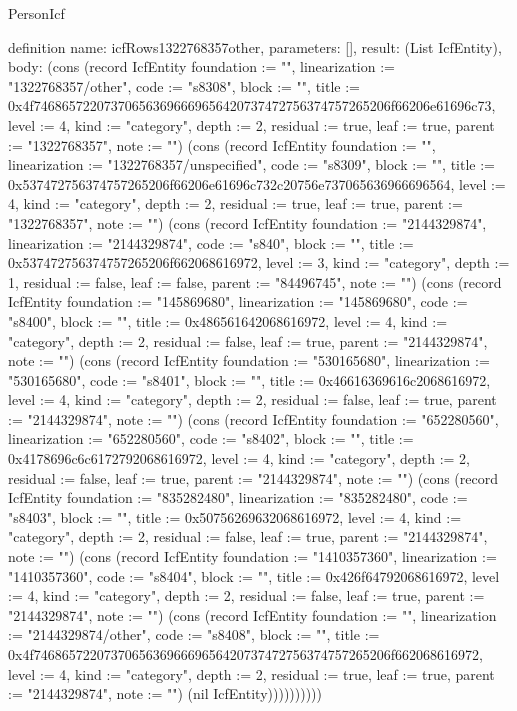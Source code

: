 \begin{lexlean}{PersonIcf}
\begin{semanticmodule}
definition{
  name: icfRows1322768357other,
  parameters: [],
  result: (List IcfEntity),
  body: (cons (record IcfEntity {foundation := "", linearization := "1322768357/other", code := "s8308", block := "", title := 0x4f746865722073706563696669656420737472756374757265206f66206e61696c73, level := 4, kind := "category", depth := 2, residual := true, leaf := true, parent := "1322768357", note := ""}) (cons (record IcfEntity {foundation := "", linearization := "1322768357/unspecified", code := "s8309", block := "", title := 0x537472756374757265206f66206e61696c732c20756e737065636966696564, level := 4, kind := "category", depth := 2, residual := true, leaf := true, parent := "1322768357", note := ""}) (cons (record IcfEntity {foundation := "2144329874", linearization := "2144329874", code := "s840", block := "", title := 0x537472756374757265206f662068616972, level := 3, kind := "category", depth := 1, residual := false, leaf := false, parent := "84496745", note := ""}) (cons (record IcfEntity {foundation := "145869680", linearization := "145869680", code := "s8400", block := "", title := 0x486561642068616972, level := 4, kind := "category", depth := 2, residual := false, leaf := true, parent := "2144329874", note := ""}) (cons (record IcfEntity {foundation := "530165680", linearization := "530165680", code := "s8401", block := "", title := 0x46616369616c2068616972, level := 4, kind := "category", depth := 2, residual := false, leaf := true, parent := "2144329874", note := ""}) (cons (record IcfEntity {foundation := "652280560", linearization := "652280560", code := "s8402", block := "", title := 0x4178696c6c6172792068616972, level := 4, kind := "category", depth := 2, residual := false, leaf := true, parent := "2144329874", note := ""}) (cons (record IcfEntity {foundation := "835282480", linearization := "835282480", code := "s8403", block := "", title := 0x50756269632068616972, level := 4, kind := "category", depth := 2, residual := false, leaf := true, parent := "2144329874", note := ""}) (cons (record IcfEntity {foundation := "1410357360", linearization := "1410357360", code := "s8404", block := "", title := 0x426f64792068616972, level := 4, kind := "category", depth := 2, residual := false, leaf := true, parent := "2144329874", note := ""}) (cons (record IcfEntity {foundation := "", linearization := "2144329874/other", code := "s8408", block := "", title := 0x4f746865722073706563696669656420737472756374757265206f662068616972, level := 4, kind := "category", depth := 2, residual := true, leaf := true, parent := "2144329874", note := ""}) (nil IcfEntity))))))))))
}


\end{semanticmodule}
\end{lexlean}

